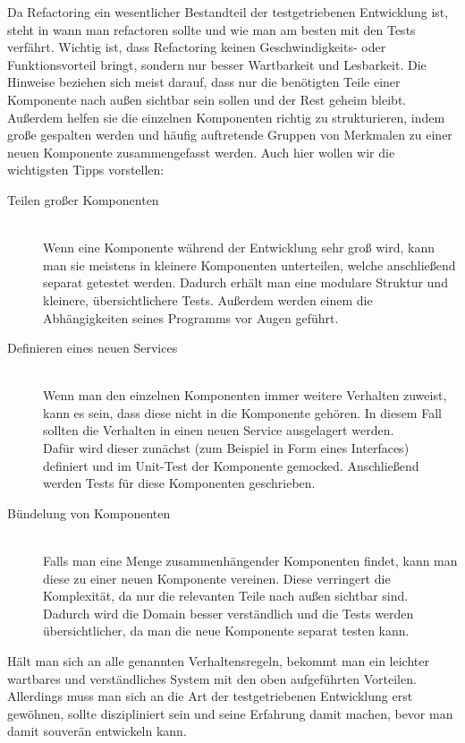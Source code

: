 Da Refactoring ein wesentlicher Bestandteil der testgetriebenen Entwicklung ist, steht in \cite{FRE10} wann man refactoren sollte und wie man am besten mit den Tests verfährt. Wichtig ist, dass Refactoring keinen Geschwindigkeits- oder Funktionsvorteil bringt, sondern nur besser Wartbarkeit und Lesbarkeit. Die Hinweise beziehen sich meist darauf, dass nur die benötigten Teile einer Komponente nach außen sichtbar sein sollen und der Rest geheim bleibt. Außerdem helfen sie die einzelnen Komponenten richtig zu strukturieren, indem große gespalten werden und häufig auftretende Gruppen von Merkmalen zu einer neuen Komponente zusammengefasst werden. Auch hier wollen wir die wichtigsten Tipps vorstellen:

\begin{description}
\item[\small Teilen großer Komponenten]~\\
	Wenn eine Komponente während der Entwicklung sehr groß wird, kann man sie meistens in kleinere Komponenten unterteilen, welche anschließend separat getestet werden. Dadurch erhält man eine modulare Struktur und kleinere, übersichtlichere Tests. Außerdem werden einem die Abhängigkeiten seines Programms vor Augen geführt.
\item[\small Definieren eines neuen Services]~\\
	Wenn man den einzelnen Komponenten immer weitere Verhalten zuweist, kann es sein, dass diese nicht in die Komponente gehören. In diesem Fall sollten die Verhalten in einen neuen Service ausgelagert werden.\\
	Dafür wird dieser zunächst (zum Beispiel in Form eines Interfaces) definiert und im Unit-Test der Komponente gemocked. Anschließend werden Tests für diese Komponenten geschrieben.
\item[\small Bündelung von Komponenten]~\\
	Falls man eine Menge zusammenhängender Komponenten findet, kann man diese zu einer neuen Komponente vereinen. Diese verringert die Komplexität, da nur die relevanten Teile nach außen sichtbar sind. Dadurch wird die Domain besser verständlich und die Tests werden übersichtlicher, da man die neue Komponente separat testen kann.
\end{description}

Hält man sich an alle genannten Verhaltensregeln, bekommt man ein leichter wartbares und verständliches System mit den oben aufgeführten Vorteilen. Allerdings muss man sich an die Art der testgetriebenen Entwicklung erst gewöhnen, sollte diszipliniert sein und seine Erfahrung damit machen, bevor man damit souverän entwickeln kann.
\pagebreak

